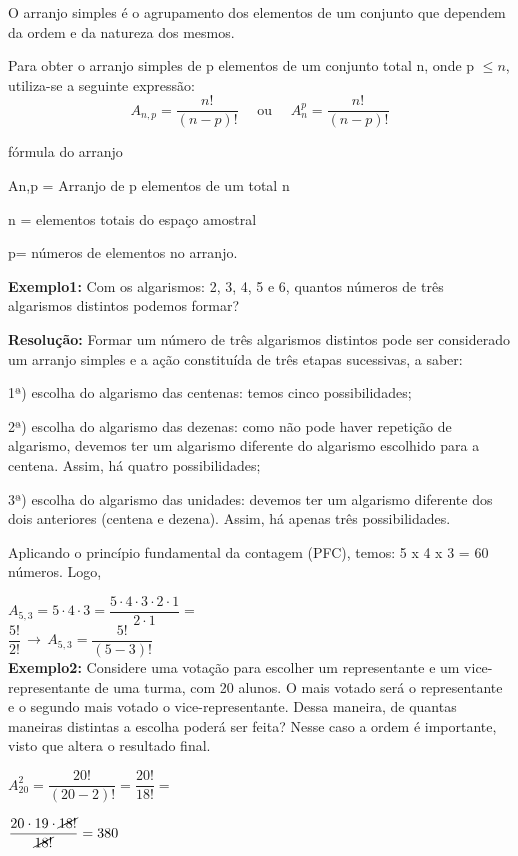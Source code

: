 \begin{multicols*}{2}
	O arranjo simples é o agrupamento dos elementos de um conjunto que dependem da ordem e da natureza dos mesmos.

	Para obter o arranjo simples de p elementos de um conjunto total  n, onde p $\leq n$, utiliza-se a seguinte expressão:
	\[ A_{n,p} = \dfrac{n!}{(n-p)!} \quad\text{ ou }\quad A^p_n = \dfrac{n!}{(n-p)!}\]

	fórmula do arranjo

	An,p = Arranjo de p elementos de um total n

	n = elementos totais do espaço amostral

	p= números de elementos no arranjo.

	\textbf{Exemplo1:} Com os algarismos: 2, 3, 4, 5 e 6, quantos números de três algarismos distintos podemos formar?

	\textbf{Resolução:} Formar um número de três algarismos distintos pode ser considerado um arranjo simples e a ação constituída de três etapas sucessivas, a saber:

	1ª) escolha do algarismo das centenas: temos cinco possibilidades;

	2ª) escolha do algarismo das dezenas: como não pode haver repetição de algarismo, devemos ter um algarismo diferente do algarismo escolhido para a centena. Assim, há quatro possibilidades;

	3ª) escolha do algarismo das unidades: devemos ter um algarismo diferente dos dois anteriores (centena e dezena). Assim, há apenas três possibilidades.

	Aplicando o princípio fundamental da contagem (PFC), temos: 5 x 4 x 3 = 60 números. Logo,

	{$A_{5,3} = 5\cdot 4 \cdot 3 = \dfrac{5 \cdot 4 \cdot 3 \cdot 2 \cdot 1}{2 \cdot 1}=$}\\

	{$ \dfrac{5!}{2!} \, \rightarrow \, A_{5,3} = \dfrac{5!}{(5 - 3)!} $}\\

	\textbf{Exemplo2: } Considere uma votação para escolher um representante e um vice-representante de uma turma, com 20 alunos. O mais votado será o representante e o segundo mais votado o vice-representante. Dessa maneira, de quantas maneiras distintas a escolha poderá ser feita? Nesse caso a ordem é importante, visto que altera o resultado final.

	{$ A^2_{20} = \dfrac{20!}{(20 -2)!} = \dfrac{20!}{18!} =$}

	{$ \dfrac{20 \cdot 19 \cdot \cancel{18!}}{\cancel{18!}} = 380$}\\


\end{multicols*}
